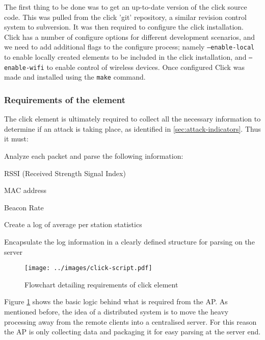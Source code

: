         The first thing to be done was to get an up-to-date version of the click source code. This was pulled from the click 'git' repository, a similar revision control system to subversion. It was then required to configure the click installation. Click has a number of configure options for different development scenarios, and we need to add additional flags to the configure process; namely \texttt{--enable-local} to enable locally created elements to be included in the click installation, and \texttt{--enable-wifi} to enable control of wireless devices. Once configured Click was made and installed using the \texttt{make} command.

        \subsubsection{Requirements of the element} \label{sec:click-requirements}
            The click element is ultimately required to collect all the necessary information to determine if an attack is taking place, as identified in \ref{sec:attack-indicators}. Thus it must:

            \begin{itemize*}
             \item Analyze each packet and parse the following information:
              \begin{itemize*}
               \item RSSI (Received Strength Signal Index)
               \item MAC address
               \item Beacon Rate
              \end{itemize*}
             \item Create a log of average per station statistics
             \item Encapsulate the log information in a clearly defined structure for parsing on the server
            \end{itemize*}

            \begin{figure}[!ht]
             \centering
             \texttt{[image: ../images/click-script.pdf]}
             \caption{Flowchart detailing requirements of click element}
             \label{fig:click-flow-chart}
            \end{figure}

            Figure \ref{fig:click-flow-chart} shows the basic logic behind what is required from the AP. As mentioned before, the idea of a distributed system is to move the heavy processing away from the remote clients into a centralised server. For this reason the AP is only collecting data and packaging it for easy parsing at the server end.
            \label{sec:discuss-minimal-tx}

